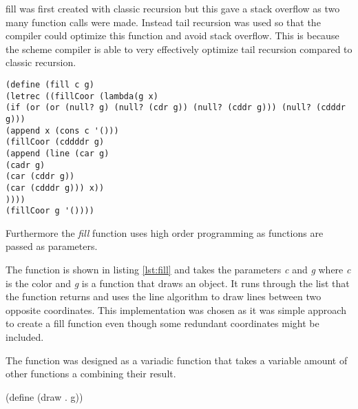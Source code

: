 fill was first created with classic recursion but this gave a stack overflow as two many function calls were made. Instead tail recursion was used so that the compiler could optimize this function and avoid stack overflow.  This is because the scheme compiler is able to very effectively optimize tail recursion compared to classic recursion.

\begin{lstlisting}[caption={Scheme function fill}, label=lst:fill]
(define (fill c g)
(letrec ((fillCoor (lambda(g x)
(if (or (or (null? g) (null? (cdr g)) (null? (cddr g))) (null? (cdddr g)))
(append x (cons c '()))
(fillCoor (cddddr g)
(append (line (car g)
(cadr g)
(car (cddr g))
(car (cdddr g))) x))
))))
(fillCoor g '())))
\end{lstlisting}

Furthermore the \emph{fill} function uses high order programming as functions are passed as parameters. 

The function is shown in listing \ref{lst:fill} and takes the parameters \emph{c} and \emph{g} where \emph{c} is the color and \emph{g} is a function that draws an object. It runs through the list that the function returns and uses the line algorithm to draw lines between two opposite coordinates. This implementation was chosen as it was simple approach to create a fill function even though some redundant coordinates might be included. 

The function was designed as a variadic function that takes a variable amount of other functions a combining their result.

(define (draw . g))
